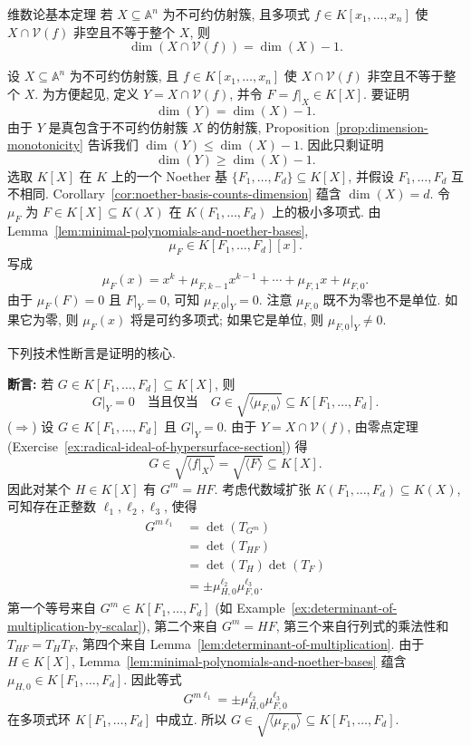 \begin{Theorem}{维数论基本定理}\leavevmode\label{thm:fundamental-theorem-of-dimension-theory}
若 $X\subseteq\mathbb{A}^{n}$ 为不可约仿射簇, 且多项式 $f\in K[x_{1},\ldots,x_{n}]$ 使 $X\cap\mathcal{V}(f)$ 非空且不等于整个 $X$, 则
\[
  \dim(X\cap\mathcal{V}(f))=\dim(X)-1.
\]
\end{Theorem}
\begin{Proof}
设 $X\subseteq\mathbb{A}^{n}$ 为不可约仿射簇, 且 $f\in K[x_{1},\ldots,x_{n}]$ 使 $X\cap\mathcal{V}(f)$ 非空且不等于整个 $X$. 为方便起见, 定义 $Y=X\cap\mathcal{V}(f)$, 并令 $F=f|_{X}\in K[X]$. 要证明
\[
  \dim(Y)=\dim(X)-1.
\]
由于 $Y$ 是真包含于不可约仿射簇 $X$ 的仿射簇, Proposition~\ref{prop:dimension-monotonicity} 告诉我们 $\dim(Y)\leq\dim(X)-1$. 因此只剩证明
\[
  \dim(Y)\geq\dim(X)-1.
\]
选取 $K[X]$ 在 $K$ 上的一个 Noether 基 $\{F_{1},\ldots,F_{d}\}\subseteq K[X]$, 并假设 $F_{1},\ldots,F_{d}$ 互不相同. Corollary~\ref{cor:noether-basis-counts-dimension} 蕴含 $\dim(X)=d$. 令 $\mu_{F}$ 为 $F\in K[X]\subseteq K(X)$ 在 $K(F_{1},\ldots,F_{d})$ 上的极小多项式. 由 Lemma~\ref{lem:minimal-polynomials-and-noether-bases},
\[
  \mu_{F}\in K[F_{1},\ldots,F_{d}][x].
\]
写成
\[
  \mu_{F}(x)=x^{k}+\mu_{F,k-1}x^{k-1}+\cdots+\mu_{F,1}x+\mu_{F,0}.
\]
由于 $\mu_{F}(F)=0$ 且 $F|_{Y}=0$, 可知 $\mu_{F,0}|_{Y}=0$. 注意 $\mu_{F,0}$ 既不为零也不是单位. 如果它为零, 则 $\mu_{F}(x)$ 将是可约多项式; 如果它是单位, 则 $\mu_{F,0}|_{Y}\neq0$.

下列技术性断言是证明的核心.

\noindent\textbf{断言:} 若 $G\in K[F_{1},\ldots,F_{d}]\subseteq K[X]$, 则
\[
  G|_{Y}=0\quad\text{当且仅当}\quad
  G\in\sqrt{\langle\mu_{F,0}\rangle}\subseteq K[F_{1},\ldots,F_{d}].
\]
($\Rightarrow$) 设 $G\in K[F_{1},\ldots,F_{d}]$ 且 $G|_{Y}=0$. 由于 $Y=X\cap\mathcal{V}(f)$, 由零点定理 (Exercise~\ref{ex:radical-ideal-of-hypersurface-section}) 得
\[
  G\in\sqrt{\langle f|_{X}\rangle}=\sqrt{\langle F\rangle}\subseteq K[X].
\]
因此对某个 $H\in K[X]$ 有 $G^{m}=HF$. 考虑代数域扩张 $K(F_{1},\ldots,F_{d})\subseteq K(X)$, 可知存在正整数 $\ell_{1},\ell_{2},\ell_{3}$, 使得
\[
  \begin{aligned}
    G^{m\ell_{1}}&=\det(T_{G^{m}})\\
      &=\det(T_{HF})\\
      &=\det(T_{H})\det(T_{F})\\
      &=\pm\mu_{H,0}^{\ell_{2}}\mu_{F,0}^{\ell_{3}}.
  \end{aligned}
\]
第一个等号来自 $G^{m}\in K[F_{1},\ldots,F_{d}]$ (如 Example~\ref{ex:determinant-of-multiplication-by-scalar}), 第二个来自 $G^{m}=HF$, 第三个来自行列式的乘法性和 $T_{HF}=T_{H}T_{F}$, 第四个来自 Lemma~\ref{lem:determinant-of-multiplication}. 由于 $H\in K[X]$, Lemma~\ref{lem:minimal-polynomials-and-noether-bases} 蕴含 $\mu_{H,0}\in K[F_{1},\ldots,F_{d}]$. 因此等式
\[
  G^{m\ell_{1}}=\pm\mu_{H,0}^{\ell_{2}}\mu_{F,0}^{\ell_{3}}
\]
在多项式环 $K[F_{1},\ldots,F_{d}]$ 中成立. 所以 $G\in\sqrt{\langle\mu_{F,0}\rangle}\subseteq K[F_{1},\ldots,F_{d}]$.


\end{Proof}
